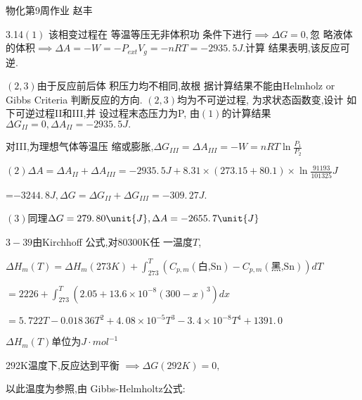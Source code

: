 \documentclass{article}
\begin{document}
\bigskip \bigskip 物化第9周作业\qquad 
赵丰

3.14$\left( 1\right) $ 该相变过程在%
等温等压无非体积功%
条件下进行$\implies \Delta G=0,$忽%
略液体的体积$\implies \Delta
A=-W=-P_{ext}V_{g}=-nRT=-2935.\,\allowbreak 5\unit{J}.$计算%
结果表明,该反应可逆.

$\left( 2,3\right) $由于反应前后体%
积压力均不相同,故根%
据计算结果不能由Helmholz or
Gibbs Criteria 判断反应的方向. $%
\left( 2,3\right) $均为不可逆过程,%
为求状态函数变,设计%
如下可逆过程II和III,并%
设过程末态压力为P, 由$%
\left( 1\right) $的计算结果$\Delta
G_{II}=0,\Delta A_{II}=-2935.\,\allowbreak 5\unit{J}.$


对III,为理想气体等温压%
缩或膨胀,$\Delta G_{III}=\Delta A_{III}=-W=nRT\ln 
\frac{P_{1}}{P_{2}}$

$\left( 2\right) \Delta A=\Delta A_{II}+\Delta A_{III}=-2935.\,5\unit{J}%
+8.31\times \left( 273.15+80.1\right) \times \ln \frac{91193}{101325}\unit{J}
$

=$-3244.\,\allowbreak 8\unit{J},\Delta G=\Delta G_{II}+\Delta
G_{III}=-309.\,\allowbreak 27\unit{J}.$

$\left( 3\right) $同理$\allowbreak \Delta G=\allowbreak
279.\,\allowbreak 80\unit{J},\Delta A=\allowbreak -2655.\,\allowbreak 7\unit{%
J}$

$3-39$由Kirchhoff 公式,对80300K任%
一温度$T$,

$\Delta H_{m}\left( T\right) =\Delta H_{m}\left( 273K\right)
+\int_{273}^{T}\left( C_{p,m}\left( \text{白,Sn}\right) -C_{p,m}\left( 
\text{黑,Sn}\right) \right) dT$

$=2226+\int_{273}^{T}\left( 2.05+13.6\times 10^{-8}\left( 300-x\right)
^{3}\right) dx$

$=\allowbreak 5.\,\allowbreak 722T-0.018\,36T^{2}+4.\,\allowbreak 08\times
10^{-5}T^{3}-3.\,\allowbreak 4\times 10^{-8}\allowbreak
T^{4}+1391.\,\allowbreak 0$

\bigskip $\Delta H_{m}\left( T\right) $单位为$\unit{J}%
\cdot \unit{mol}^{-1}$

292K温度下,反应达到平衡%
$\implies \Delta G\left( 292K\right) =0,$

以此温度为参照,由%
Gibbs-Helmholtz公式:
\end{document}
